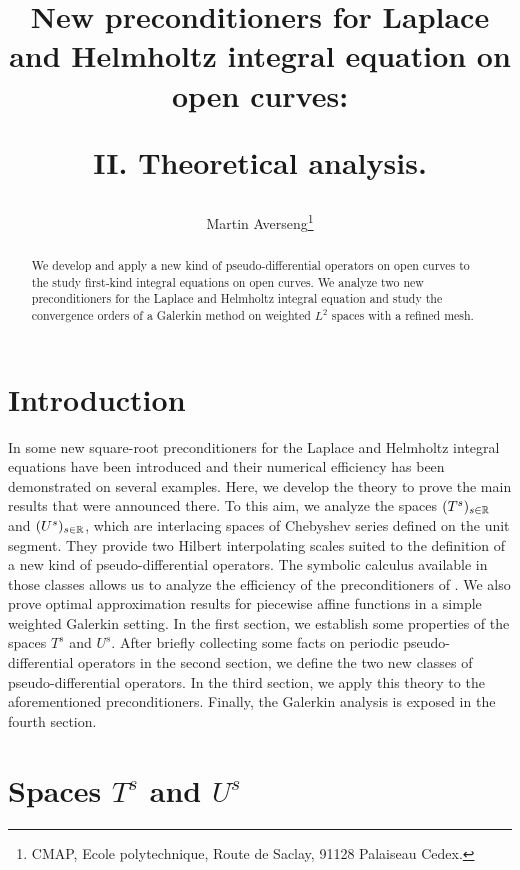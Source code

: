 \documentclass[a4paper]{article}
\title{New preconditioners for Laplace and  Helmholtz integral equation on open curves: \\ \vspace{0.5cm}
	\begin{Large} 
		II. Theoretical analysis.
	\end{Large} }
\author{Martin Averseng\footnote{CMAP, Ecole polytechnique, Route de Saclay, 91128 Palaiseau Cedex.}}
\begin{document}
\maketitle

\begin{abstract}
	We develop and apply a new kind of pseudo-differential operators on open curves to the study first-kind integral equations on open curves. We analyze two new preconditioners for the Laplace and Helmholtz integral equation and study the convergence orders of a Galerkin method on weighted $L^2$ spaces with a refined mesh.  
\end{abstract}

\section*{Introduction}

In \cite{alouges2018new} some new square-root preconditioners for the Laplace and Helmholtz integral equations have been introduced and their numerical efficiency has been demonstrated on several examples. Here, we develop the theory to prove the main results that were announced there. To this aim, we analyze the spaces $(T^s)_{s\in \mathbb{R}}$ and $(U^s)_{s \in \mathbb{R}}$, which are interlacing spaces of Chebyshev series defined on the unit segment. They provide two Hilbert interpolating scales suited to the definition of a new kind of pseudo-differential operators. The symbolic calculus available in those classes allows us to analyze the efficiency of the preconditioners of \cite{alouges2018new}. We also prove optimal approximation results for piecewise affine functions in a simple weighted Galerkin setting. 
In the first section, we establish some properties of the spaces $T^s$ and $U^s$. After briefly collecting some facts on periodic pseudo-differential operators in the second section, we define the two new classes of pseudo-differential operators. In the third section, we apply this theory to the aforementioned preconditioners. Finally, the Galerkin analysis is exposed in the fourth section. 

 
\section{Spaces $T^s$ and $U^s$}
\end{document}
